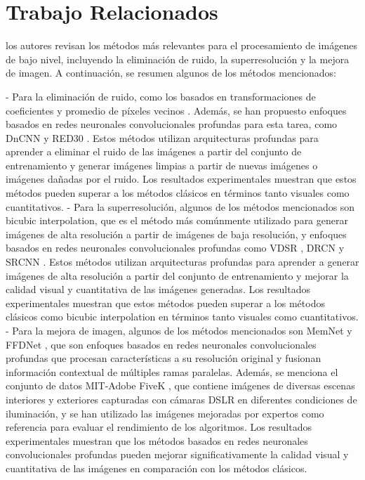 \documentclass[a4paper,
               ]{jacow}
\begin{document}
\section{Trabajo Relacionados}
 los autores revisan los métodos más relevantes para el procesamiento de imágenes de bajo nivel, incluyendo la eliminación de ruido, la superresolución y la mejora de imagen. A continuación, se resumen algunos de los métodos mencionados:

- Para la eliminación de ruido, como los basados en transformaciones de coeficientes y promedio de píxeles vecinos \cite{zhang2017beyond}. Además, se han propuesto enfoques basados en redes neuronales convolucionales profundas para esta tarea, como DnCNN \cite{zhang2017beyond} y RED30 \cite{mao2019red30}. Estos métodos utilizan arquitecturas profundas para aprender a eliminar el ruido de las imágenes a partir del conjunto de entrenamiento y generar imágenes limpias a partir de nuevas imágenes o imágenes dañadas por el ruido. Los resultados experimentales muestran que estos métodos pueden superar a los métodos clásicos en términos tanto visuales como cuantitativos.
- Para la superresolución, algunos de los métodos mencionados son bicubic interpolation, que es el método más comúnmente utilizado para generar imágenes de alta resolución a partir de imágenes de baja resolución, y enfoques basados en redes neuronales convolucionales profundas como VDSR \cite{vdsr}, DRCN \cite{kim2016deeply} y SRCNN \cite{dong2016image}. Estos métodos utilizan arquitecturas profundas para aprender a generar imágenes de alta resolución a partir del conjunto de entrenamiento y mejorar la calidad visual y cuantitativa de las imágenes generadas. Los resultados experimentales muestran que estos métodos pueden superar a los métodos clásicos como bicubic interpolation en términos tanto visuales como cuantitativos.
- Para la mejora de imagen,  algunos de los métodos mencionados son MemNet \cite{tai2017memnet} y FFDNet \cite{zhang2018ffdnet}, que son enfoques basados en redes neuronales convolucionales profundas que procesan características a su resolución original y fusionan información contextual de múltiples ramas paralelas. Además, se menciona el conjunto de datos MIT-Adobe FiveK \cite{dabov2007image}, que contiene imágenes de diversas escenas interiores y exteriores capturadas con cámaras DSLR en diferentes condiciones de iluminación, y se han utilizado las imágenes mejoradas por expertos como referencia para evaluar el rendimiento de los algoritmos. Los resultados experimentales muestran que los métodos basados en redes neuronales convolucionales profundas pueden mejorar significativamente la calidad visual y cuantitativa de las imágenes en comparación con los métodos clásicos.
\end{document}
